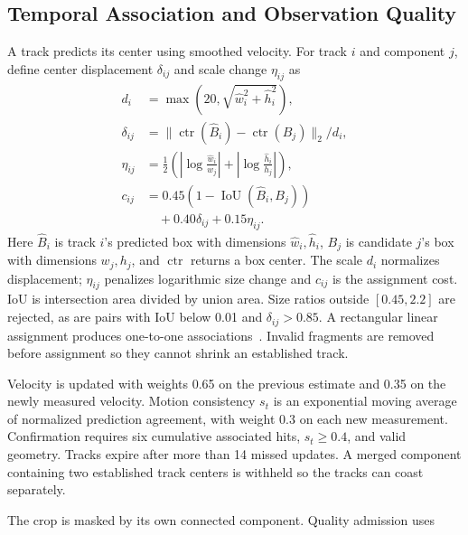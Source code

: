 \documentclass[conference]{IEEEtran}
\begin{document}
\subsection{Temporal Association and Observation Quality}
A track predicts its center using smoothed velocity. For track $i$ and component $j$, define center displacement $\delta_{ij}$ and scale change $\eta_{ij}$ as
\begin{equation}
\begin{aligned}
d_i&=\max(20,\sqrt{\widehat w_i^2+\widehat h_i^2}),\\
\delta_{ij}&=\|\operatorname{ctr}(\widehat B_i)-\operatorname{ctr}(B_j)\|_2/d_i,\\
\eta_{ij}&=\tfrac12\left(\left|\log\tfrac{\widehat w_i}{w_j}\right|
+\left|\log\tfrac{\widehat h_i}{h_j}\right|\right),\\
c_{ij}&=0.45(1-\operatorname{IoU}(\widehat B_i,B_j))\\
&\quad+0.40\delta_{ij}+0.15\eta_{ij}.
\end{aligned}
\end{equation}
Here $\widehat B_i$ is track $i$'s predicted box with dimensions $\widehat w_i,\widehat h_i$, $B_j$ is candidate $j$'s box with dimensions $w_j,h_j$, and $\operatorname{ctr}$ returns a box center. The scale $d_i$ normalizes displacement; $\eta_{ij}$ penalizes logarithmic size change and $c_{ij}$ is the assignment cost. IoU is intersection area divided by union area. Size ratios outside $[0.45,2.2]$ are rejected, as are pairs with IoU below 0.01 and $\delta_{ij}>0.85$. A rectangular linear assignment produces one-to-one associations~\cite{scipylsa}. Invalid fragments are removed before assignment so they cannot shrink an established track.

Velocity is updated with weights 0.65 on the previous estimate and 0.35 on the newly measured velocity. Motion consistency $s_t$ is an exponential moving average of normalized prediction agreement, with weight 0.3 on each new measurement. Confirmation requires six cumulative associated hits, $s_t\ge0.4$, and valid geometry. Tracks expire after more than 14 missed updates. A merged component containing two established track centers is withheld so the tracks can coast separately.

The crop is masked by its own connected component. Quality admission uses
\end{document}
